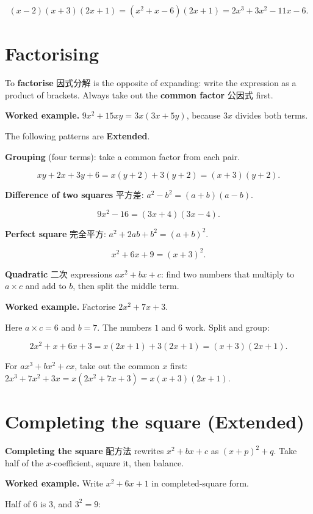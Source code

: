 \documentclass[11pt]{article}
\begin{document}
\[
(x - 2)(x + 3)(2x + 1) = (x^{2} + x - 6)(2x + 1) = 2x^{3} + 3x^{2} - 11x - 6.
\]

\section*{Factorising}

To \textbf{factorise} 因式分解 is the opposite of expanding: write the expression as a product of brackets. Always take out the \textbf{common factor} 公因式 first.

\textbf{Worked example.} $9x^{2} + 15xy = 3x(3x + 5y)$, because $3x$ divides both terms.

The following patterns are \textbf{Extended}.

\textbf{Grouping} (four terms): take a common factor from each pair.

\[
xy + 2x + 3y + 6 = x(y + 2) + 3(y + 2) = (x + 3)(y + 2).
\]

\textbf{Difference of two squares} 平方差: $a^{2} - b^{2} = (a + b)(a - b)$.

\[
9x^{2} - 16 = (3x + 4)(3x - 4).
\]

\textbf{Perfect square} 完全平方: $a^{2} + 2ab + b^{2} = (a + b)^{2}$.

\[
x^{2} + 6x + 9 = (x + 3)^{2}.
\]

\textbf{Quadratic} 二次 expressions $ax^{2} + bx + c$: find two numbers that multiply to $a \times c$ and add to $b$, then split the middle term.

\textbf{Worked example.} Factorise $2x^{2} + 7x + 3$.

Here $a \times c = 6$ and $b = 7$. The numbers $1$ and $6$ work. Split and group:

\[
2x^{2} + x + 6x + 3 = x(2x + 1) + 3(2x + 1) = (x + 3)(2x + 1).
\]

For $ax^{3} + bx^{2} + cx$, take out the common $x$ first: $2x^{3} + 7x^{2} + 3x = x(2x^{2} + 7x + 3) = x(x + 3)(2x + 1)$.

\section*{Completing the square (Extended)}

\textbf{Completing the square} 配方法 rewrites $x^{2} + bx + c$ as $(x + p)^{2} + q$. Take half of the $x$-coefficient, square it, then balance.

\textbf{Worked example.} Write $x^{2} + 6x + 1$ in completed-square form.

Half of $6$ is $3$, and $3^{2} = 9$:
\end{document}
